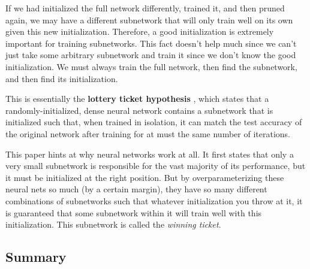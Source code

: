     If we had initialized the full network differently, trained it, and then pruned again, we may have a different subnetwork that will only train well on its own given this new initialization. Therefore, a good initialization is extremely important for training subnetworks. This fact doesn't help much since we can't just take some arbitrary subnetwork and train it since we don't know the good initialization. We must always train the full network, then find the subnetwork, and then find its initialization. 

    This is essentially the \textbf{lottery ticket hypothesis} \cite{frankle2019lottery}, which states that a randomly-initialized, dense neural network contains a subnetwork that is initialized such that, when trained in isolation, it can match the test accuracy of the original network after training for at must the same number of iterations. 

    This paper hints at why neural networks work at all. It first states that only a very small subnetwork is responsible for the vast majority of its performance, but it must be initialized at the right position. But by overparameterizing these neural nets so much (by a certain margin), they have so many different combinations of subnetworks such that whatever initialization you throw at it, it is guaranteed that some subnetwork within it will train well with this initialization. This subnetwork is called the \textit{winning ticket}. 

  \subsection{Summary}

